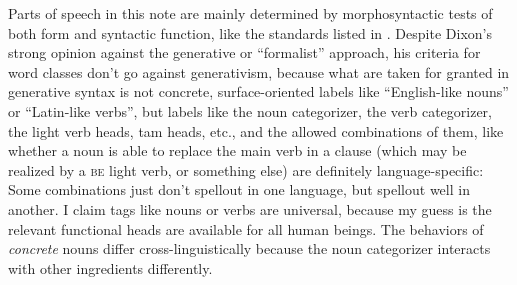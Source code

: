 \documentclass[UTF8, a4paper, oneside, scheme=plain]{ctexrep}
\newcommand*{\citesec}[1]{\S~{#1}}
\newcommand{\category}[1]{\textsc{#1}}
\begin{document}
Parts of speech in this note are mainly determined 
by morphosyntactic tests of both form and syntactic function,
like the standards listed in \citet[\citesec{3.3}]{dixon2009basic1}.
Despite Dixon's strong opinion against the generative or ``formalist'' approach,
his criteria for word classes don't go against generativism,
because what are taken for granted in generative syntax 
is not concrete, surface-oriented labels like ``English-like nouns'' or ``Latin-like verbs'', 
but labels like the noun categorizer, the verb categorizer,
the light verb heads, \acs{tam} heads, etc.,
and the allowed combinations of them, 
like whether a noun is able to replace the main verb in a clause 
(which may be realized by a \category{be} light verb, or something else)
are definitely language-specific:
Some combinations just don't spellout in one language,
but spellout well in another.
I claim tags like nouns or verbs are universal,
because my guess is the relevant functional heads are available for all human beings.
The behaviors of \emph{concrete} nouns differ cross-linguistically
because the noun categorizer interacts with other ingredients differently.
\end{document}
